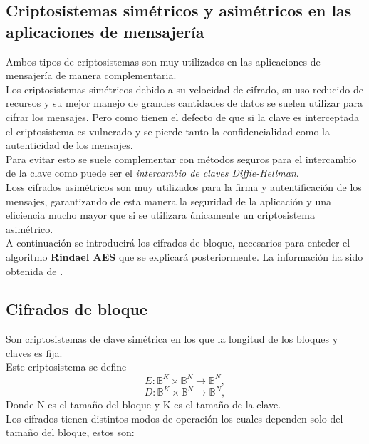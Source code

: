 \subsection{Criptosistemas simétricos y asimétricos en las aplicaciones de mensajería}
Ambos tipos de criptosistemas son muy utilizados en las aplicaciones de mensajería de manera complementaria.\\ 
Los criptosistemas simétricos debido a su velocidad de cifrado, su uso reducido de recursos y su mejor manejo de grandes cantidades de datos se suelen utilizar para cifrar los mensajes. 
Pero como tienen el defecto de que si la clave es interceptada el criptosistema es vulnerado y se pierde tanto la confidencialidad como la autenticidad de los mensajes.\\ 
Para evitar esto se suele complementar con métodos seguros para el intercambio de la clave como puede ser el \emph{intercambio de claves Diffie-Hellman}.\\
Loss cifrados asimétricos son muy utilizados para la firma y autentificación de los mensajes, garantizando de esta manera la seguridad de la aplicación y una eficiencia mucho mayor que si se utilizara únicamente un criptosistema asimétrico.\\
A continuación se introducirá los cifrados de bloque, necesarios para enteder el algoritmo \textbf{Rindael AES} que se explicará posteriormente. La información ha sido obtenida de \cite{apuntesCriptografia}.

\subsection{Cifrados de bloque}
Son criptosistemas de clave simétrica en los que la longitud de los bloques y claves es fija.\\
Este criptosistema se define
$$
	E:\mathbb{B}^K\times\mathbb{B}^N\rightarrow \mathbb{B}^N,
$$
$$
	D:\mathbb{B}^K\times\mathbb{B}^N\rightarrow \mathbb{B}^N,
$$
Donde N es el tamaño del bloque y K es el tamaño de la clave.\\
Los cifrados tienen distintos modos de operación los cuales dependen solo del tamaño del bloque, estos son:\\

